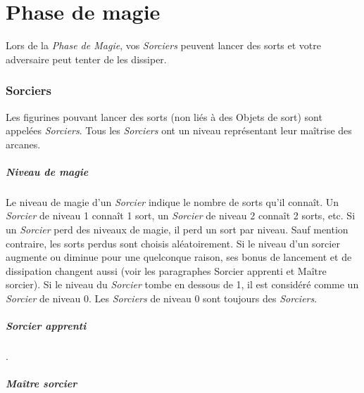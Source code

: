 
\part{Phase de magie}

Lors de la \emph{Phase de Magie}, vos \emph{Sorciers} peuvent lancer des sorts et votre adversaire peut tenter de les dissiper.

\section{Sorciers}

Les figurines pouvant lancer des sorts (non liés à des Objets de sort) sont appelées \emph{Sorciers}. Tous les \emph{Sorciers} ont un niveau représentant leur maîtrise des arcanes. 

\subsubsection*{Niveau de magie} 

Le niveau de magie d'un \emph{Sorcier} indique le nombre de sorts qu'il connaît. Un \emph{Sorcier} de niveau 1 connaît 1 sort, un \emph{Sorcier} de niveau 2 connaît 2 sorts, etc. Si un \emph{Sorcier} perd des niveaux de magie, il perd un sort par niveau. Sauf mention contraire, les sorts perdus sont choisis aléatoirement. Si le niveau d'un sorcier augmente ou diminue pour une quelconque raison, ses bonus de lancement et de dissipation changent aussi (voir les paragraphes Sorcier apprenti et Maître sorcier). Si le niveau du \emph{Sorcier} tombe en dessous de 1, il est considéré comme un \emph{Sorcier} de niveau 0. Les \emph{Sorciers} de niveau 0 sont toujours des \emph{Sorciers}.

\subsubsection*{Sorcier apprenti} 

.

\subsubsection*{Maître sorcier} 



